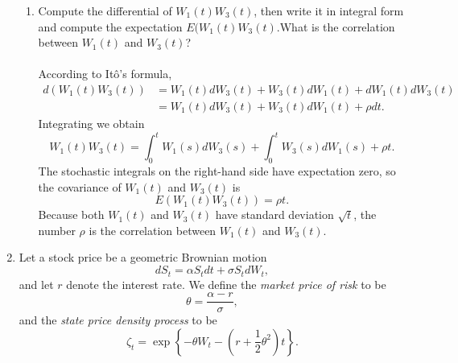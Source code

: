 \documentclass[11pt,a4,table]{article}
\begin{document}
\begin{enumerate}
\begin{enumerate}
        \item Compute the differential of $W_1(t) W_3(t)$, then write it in integral form and compute the expectation $E(W_1(t)W_3(t)$.What is the correlation between $W_1(t)$ and $W_3(t)$?\\\\
        According to Itô's formula,
        \begin{align*}
            d(W_1(t)W_3(t)) &= W_1(t) dW_3(t) + W_3(t) dW_1(t) + dW_1(t)dW_3(t)\\
            &= W_1(t) dW_3(t) + W_3(t) dW_1(t) +\rho dt.
        \end{align*}
        Integrating we obtain
        \begin{equation*}
            W_1(t) W_3(t) = \int_0^t W_1(s) dW_3(s) + \int_0^t W_3(s) dW_1(s) + \rho t.
        \end{equation*}
        The stochastic integrals on the right-hand side have expectation zero, so the covariance of $W_1(t)$ and $W_3(t)$ is
        \begin{equation*}
            E(W_1(t)W_3(t)) = \rho t.
        \end{equation*}
        Because both $W_1(t)$ and $W_3(t)$ have standard deviation $\sqrt{t}$, the number $\rho$ is the correlation between $W_1(t)$  and $W_3(t)$.
    \end{enumerate}
    
    
    \item Let a stock price be a geometric Brownian motion
    \begin{equation*}
        dS_t= \alpha S_t dt + \sigma S_t dW_t,
    \end{equation*}
    and let $r$ denote the interest rate. We define the \textit{market price of risk} to be
    \begin{equation*}
        \theta = \frac{\alpha -r}{\sigma},
    \end{equation*}
    and the \textit{state price density process} to be
    \begin{equation*}
        \zeta_t = \exp\left\{-\theta W_t -\left(r + \frac{1}{2}\theta^2\right) t\right\}.
    \end{equation*}
    

\end{enumerate}
\end{document}
